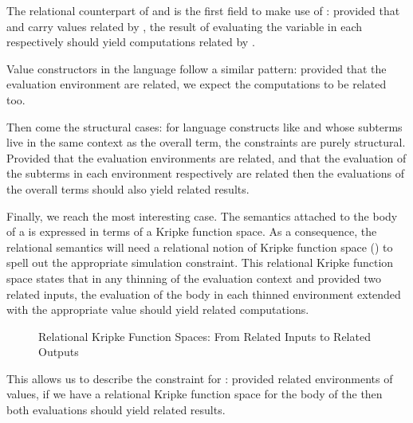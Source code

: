 
The relational counterpart of  and  is the first field to make use
of : provided that  and  carry values related by , the result
of evaluating the variable  in each respectively should yield computations related
by .


Value constructors in the language follow a similar pattern: provided that the evaluation
environment are related, we expect the computations to be related too.


Then come the structural cases: for language constructs like  and 
whose subterms live in the same context as the overall term, the constraints are purely
structural. Provided that the evaluation environments are related, and that the evaluation
of the subterms in each environment respectively are related then the evaluations of the
overall terms should also yield related results.


Finally, we reach the most interesting case. The semantics attached to the body of a
 is expressed in terms of a Kripke function space. As a consequence, the
relational semantics will need a relational notion of Kripke function space ()
to spell out the appropriate simulation constraint. This relational Kripke function space
states that in any thinning of the evaluation context and provided two related inputs,
the evaluation of the body in each thinned environment extended with the appropriate
value should yield related computations.

\begin{figure}[h]
\caption{Relational Kripke Function Spaces: From Related Inputs to Related Outputs\label{fig:relationalkripke}}
\end{figure}

This allows us to describe the constraint for : provided related environments
of values, if we have a relational Kripke function space for the body of the 
then both evaluations should yield related results.

